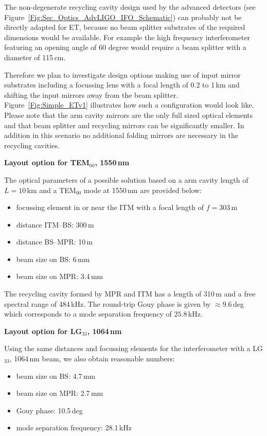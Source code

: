 The non-degenerate recycling cavity design used by the advanced detectors (see Figure~\ref{Fig:Sec_Optics_AdvLIGO_IFO_Schematic}) can probably not be directly adapted for ET, because no beam splitter substrates of the required dimensions would be available. For example the high frequency interferometer featuring an opening angle of  60 degree would require a beam splitter with a diameter of 115\,cm.

Therefore we plan to investigate design options making use of input mirror substrates including a focussing lens with a focal length of 0.2 to 1\,km and shifting the input mirrors away from the beam splitter.  Figure~\ref{Fig:Simple_ETv1} illustrates how such a configuration would look like. Please note that the arm cavity mirrors are the only full sized optical elements and that beam splitter and recycling mirrors can be significantly smaller. In addition in this scenario no additional folding mirrors are necessary in the recycling cavities.

\textbf{Layout option for TEM$_{00}$, 1550\,nm}
\nopagebreak

The optical parameters of a possible solution based on a arm cavity length of $L=10$\,km and a TEM$_{00}$ mode at 1550\,nm are provided below:
\begin{itemize}
\item focussing element in or near the ITM with a focal length of $f=303$\,m
\item distance ITM--BS: 300\,m
\item distance BS--MPR: 10\,m
\item beam size on BS: 6\,mm
\item beam size on MPR: 3.4\,mm
\end{itemize}

The recycling cavity formed by MPR and ITM has a length of 310\,m and a free spectral range of 484\,kHz. The round-trip Gouy phase is given by $\approx 9.6$\,deg which corresponds to a mode separation frequency of $25.8$\,kHz.

\textbf{Layout option for LG$_{33}$, 1064\,nm}
\nopagebreak

Using the same distances and focussing elements for the interferometer with a LG$_{33}$, 1064\,nm beam, we also obtain reasonable numbers:
\begin{itemize}
\item beam size on BS: 4.7\,mm
\item beam size on MPR: 2.7\,mm
\item Gouy phase: 10.5\,deg
\item mode separation frequency:  28.1\,kHz
\end{itemize}

